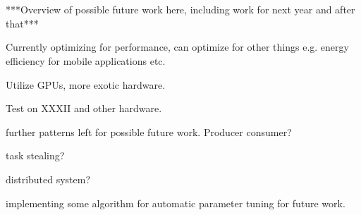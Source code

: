 \section{}

***Overview of possible future work here, including work for next year and after that***

Currently optimizing for performance, can  optimize for other things e.g. energy efficiency for mobile applications etc.

Utilize GPUs, more exotic hardware.

Test on XXXII and other hardware.

further patterns left for possible future work. Producer consumer?

task stealing?

distributed system?

implementing some algorithm for automatic parameter tuning for future work.